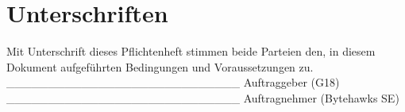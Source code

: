 \documentclass[a4paper,11pt,abstracton,titlepage]{scrartcl}
\begin{document}
\section{Unterschriften}
Mit Unterschrift dieses Pflichtenheft stimmen beide
Parteien den, in diesem Dokument aufgeführten Bedingungen und Voraussetzungen
zu.  
\newline\newline 
\_\_\_\_\_\_\_\_\_\_\_\_\_\_\_\_\_\_\_\_\_\_\_\_\_\_\_\_
\newline Auftraggeber
(G18) 
\newline \newline\newline
\_\_\_\_\_\_\_\_\_\_\_\_\_\_\_\_\_\_\_\_\_\_\_\_\_\_\_\_
\newline Auftragnehmer (Bytehawks SE)
\newline 
\end{document}
